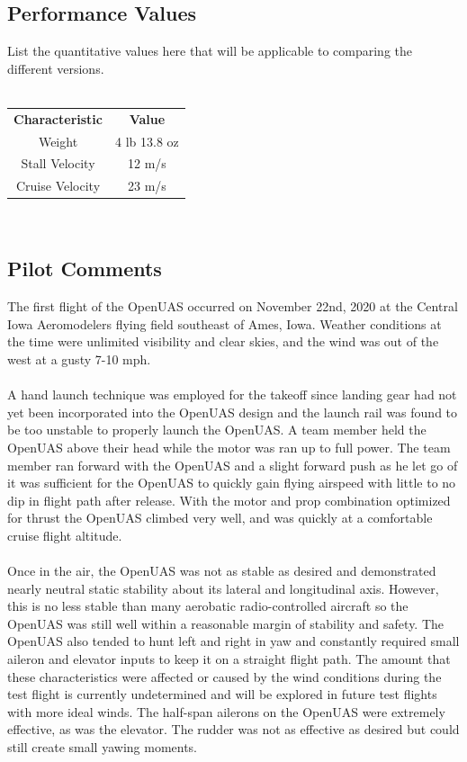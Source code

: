 \documentclass{article}
\begin{document}
\subsection*{Performance Values}
List the quantitative values here that will be applicable to comparing the different versions. \\ \\
\begin{tabular}{ c c }
	 \textbf{Characteristic} & \textbf{Value}  \\
	Weight & 4 lb 13.8 oz \\
	Stall Velocity & 12 m/s  \\ 
	Cruise Velocity & 23 m/s
\end{tabular} \\

\subsection*{Pilot Comments}
The first flight of the OpenUAS occurred on November 22nd, 2020 at the Central Iowa Aeromodelers flying field southeast of Ames, Iowa. Weather conditions at the time were unlimited visibility and clear skies, and the wind was out of the west at a gusty 7-10 mph. \\ \\

A hand launch technique was employed for the takeoff since landing gear had not yet been incorporated into the OpenUAS design and the launch rail was found to be too unstable to properly launch the OpenUAS. A team member held the OpenUAS above their head while the motor was ran up to full power. The team member ran forward with the OpenUAS and a slight forward push as he let go of it was sufficient for the OpenUAS to quickly gain flying airspeed with little to no dip in flight path after release. With the motor and prop combination optimized for thrust the OpenUAS climbed very well, and was quickly at a comfortable cruise flight altitude. \\ \\

Once in the air, the OpenUAS was not as stable as desired and demonstrated nearly neutral static stability about its lateral and longitudinal axis. However, this is no less stable than many aerobatic radio-controlled aircraft so the OpenUAS was still well within a reasonable margin of stability and safety. The OpenUAS also tended to hunt left and right in yaw and constantly required small aileron and elevator inputs to keep it on a straight flight path. The amount that these characteristics were affected or caused by the wind conditions during the test flight is currently undetermined and will be explored in future test flights with more ideal winds. The half-span ailerons on the OpenUAS were extremely effective, as was the elevator. The rudder was not as effective as desired but could still create small yawing moments.
\end{document}
